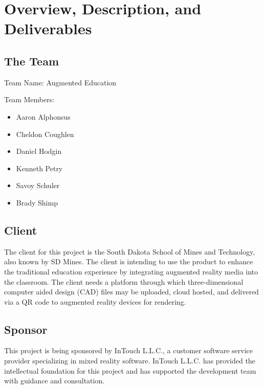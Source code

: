 

\chapter{Overview, Description, and Deliverables}


\section{The Team}

Team Name: Augmented Education

\noindent Team Members:
\begin{itemize}
	\item Aaron Alphonsus
	\item Cheldon Coughlen
	\item Daniel Hodgin
	\item Kenneth Petry
	\item Savoy Schuler
	\item Brady Shimp
\end{itemize}

\section{Client}

The client for this project is the South Dakota School of Mines and Technology, also known by SD Mines. The client is intending to use the product to enhance the traditional education experience by integrating augmented reality media into the classroom. The client needs a platform through which three-dimensional computer aided design (CAD) files may be uploaded, cloud hosted, and delivered via a QR code to augmented reality devices for rendering.

\section{Sponsor}

This project is being sponsored by InTouch L.L.C., a customer software service provider specializing in mixed reality software. InTouch L.L.C. has provided the intellectual foundation for this project and has supported the development team with guidance and consultation. 


